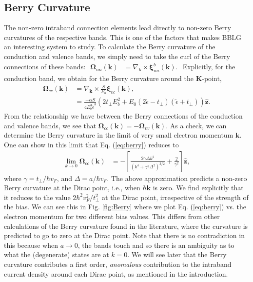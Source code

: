 \documentclass[twocolumn,secnumarabic,amssymb, nobibnotes, aps, prd, superscriptaddress]{revtex4-1}
\begin{document}
\subsection{Berry Curvature}
The non-zero intraband connection elements lead directly to non-zero Berry curvatures of the respective bands. This is one of the factors that makes BBLG an interesting system to study. To calculate the Berry curvature of the conduction and valence bands, we simply need to take the curl of the Berry connections of these bands: $\begin{aligned}\mathbf{\Omega}_{nn}(\mathbf{k}) & =\nabla_{\mathbf{k}}\times\mathbf{\xi}_{nn}^{b}(\mathbf{k}).\end{aligned}$ Explicitly, for the conduction band, we obtain for the Berry curvature around the $\mathbf{K}$-point,
\begin{equation}
\begin{aligned}\mathbf{\Omega}_{cc}(\mathbf{k}) & =\nabla_{\mathbf{k}}\times\frac{S}{E_{b}}\mathbf{\xi}_{vc}(\mathbf{k}),\\
 & =\frac{-\alpha S}{4E_{b}^{3}\tilde{\epsilon}^{3}}\left(2t_{\perp}E_{b}^{2}+E_{0}(2\tilde{\epsilon}-t_{\perp})(\tilde{\epsilon}+t_{\perp})\right)\hat{\mathbf{z}}.
\end{aligned}\label{eq:berry}
\end{equation}
From the relationship we have between the Berry connections of the conduction and valence bands, we see that $\mathbf{\Omega}_{cc}(\mathbf{k})=-\mathbf{\Omega}_{vv}(\mathbf{k}).$ As a check, we can determine the Berry curvature in the limit of very small electron momentum $\mathbf{k}$. One can show in this limit that Eq. (\ref{eq:berry}) reduces to 
\begin{equation}
\begin{aligned}\lim_{k\rightarrow0}\mathbf{\Omega}_{cc}(\mathbf{k}) & =-\left[\frac{2\gamma\Delta k^{2}}{\left(k^{4}+\gamma^{2}\Delta^{2}\right)^{3/2}}+\frac{2}{\gamma^{2}}\right]\hat{\mathbf{z}},\end{aligned}
\end{equation}
where $\gamma=t_{\perp}/\hbar v_{F}$, and $\Delta=a/\hbar v_{F}$. The above approximation predicts a non-zero Berry curvature at the Dirac point, i.e., when $\hbar\mathbf{k}$ is zero. We find explicitly that it reduces to the value $2\hbar^{2}v_{F}^{2}/t_{\perp}^{2}$ at the Dirac point, irrespective of the strength of the bias.  We can see this  in Fig. \ref{fig:Berry} where we plot Eq. (\ref{eq:berry}) vs. the electron momentum for two different bias values. This differs from other calculations of the Berry curvature found in the literature, where the curvature is predicted to go to zero at the Dirac point\cite{zhang2013valley}. Note that there is no contradiction in this because when $a\rightarrow0$, the bands touch and so there is an ambiguity as to what the (degenerate) states are at $k=0$. We will see later that the Berry curvature contributes a first order, \textit{anomalous} contribution to the intraband current density around each Dirac point, as mentioned in the introduction.
\end{document}
